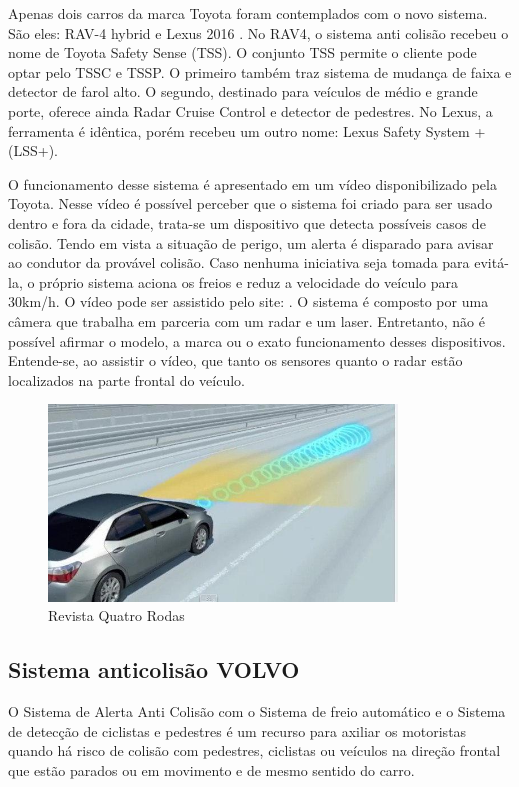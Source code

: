 Apenas dois carros da marca Toyota foram contemplados com o novo sistema. São eles: RAV-4 hybrid e Lexus 2016 \cite{3comper}. No RAV4, o sistema anti colisão recebeu o nome de Toyota Safety Sense (TSS). O conjunto TSS permite o cliente pode optar pelo TSSC e TSSP. O primeiro também traz sistema de mudança de faixa e detector de farol alto. O segundo, destinado para veículos de médio e grande porte, oferece ainda Radar Cruise Control e detector de pedestres. No Lexus, a ferramenta é idêntica, porém recebeu um outro nome: Lexus Safety System + (LSS+).

O funcionamento desse sistema é apresentado em um vídeo disponibilizado pela Toyota. Nesse vídeo é possível perceber que o sistema foi criado para ser usado dentro e fora da cidade, trata-se um dispositivo que detecta possíveis casos de colisão. Tendo em vista a situação de perigo, um alerta é disparado para avisar ao condutor da provável colisão. Caso nenhuma iniciativa seja tomada para evitá-la, o próprio sistema aciona os freios e reduz a velocidade do veículo para 30km/h. O vídeo pode ser assistido pelo site: \cite{4comper}. O sistema é composto por uma câmera que trabalha em parceria com um radar e um laser. Entretanto, não é possível afirmar o modelo, a marca ou o exato funcionamento desses dispositivos. Entende-se, ao assistir o vídeo, que tanto os sensores quanto o radar estão localizados na parte frontal do veículo.

\begin{figure}[h!]
  \centering
  \includegraphics[width=350px, scale=0.5]{figuras/sinal_componentes}
  \caption{Revista Quatro Rodas}
\label{fig:sinal_componentes}
\end{figure}

\subsection{Sistema anticolisão VOLVO}

O Sistema de Alerta Anti Colisão com o Sistema de freio automático e o Sistema de detecção de ciclistas e pedestres é um recurso para axiliar os motoristas quando há risco de colisão com pedestres, ciclistas ou veículos na direção frontal que estão parados ou em movimento e de mesmo sentido do carro. 

